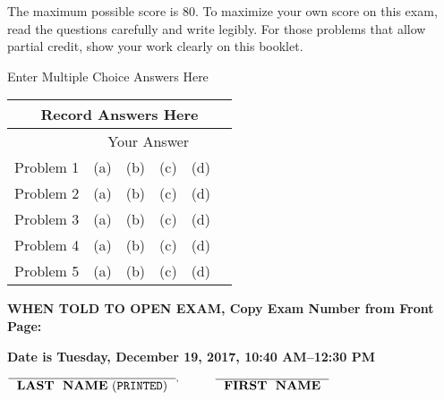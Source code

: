 \documentclass[letterpaper]{article}
\newcommand{\bline}[1]{\underline{\hspace*{#1}}}
\begin{document}
\noindent The maximum possible score is 80. To maximize your own score on this exam, read the questions carefully and write legibly.  For those problems that allow partial credit, show your work clearly on this booklet.

\newpage

\vspace*{4cm}

\begin{center}
\bf

\Large
Enter Multiple Choice Answers Here
\end{center}

\vspace*{4cm}

\begin{center}
\LARGE
\begin{tabular}{|p{1.2in}|p{1.5in}|}
\hline
\multicolumn{2}{|c|}{\textbf{Record Answers Here}}\\
\hline
 & ~~Your Answer\\
\hline
Problem 1 &   (a)~~(b)~~(c)~~(d)~~\\
\hline
Problem 2 &   (a)~~(b)~~(c)~~(d)~~\\
\hline
Problem 3 &   (a)~~(b)~~(c)~~(d)~~\\
\hline
Problem 4 &   (a)~~(b)~~(c)~~(d)~~\\
\hline
Problem 5 &   (a)~~(b)~~(c)~~(d)~~\\
\hline
\end{tabular}
\end{center}

\newpage

\begin{flushright}
{\bf \large WHEN TOLD TO OPEN EXAM, Copy Exam Number from Front Page:}\bline{1.0in}
\end{flushright}

\vspace*{.1in}
\begin{center} %
\bf
Date is Tuesday, December 19, 2017, 10:40 AM--12:30 PM \\
\end{center}

\vspace*{1in}

\begin{center}
$\overline{\mathrm ~~{\bf LAST~~NAME}~ ({\tt PRINTED})~~}^, \hspace*{.4in} \overline{\mathrm ~~{\bf FIRST~~NAME}~~}$ \\

\vspace*{1cm}


\end{center}
\end{document}

